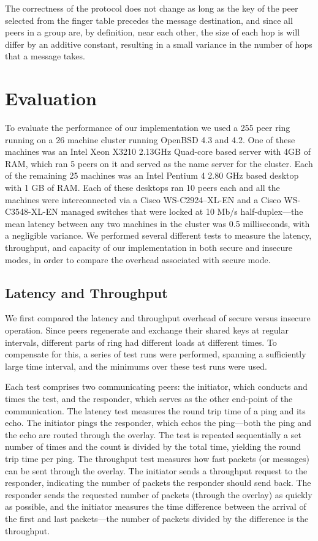 \documentclass[11pt]{article}
\begin{document}
The correctness of the protocol does not change as long as the key 
of the peer selected from the finger table precedes the message
destination, and since all peers in a group are, by definition,
near each other, the size of each hop is will differ by an 
additive constant, resulting in a small variance in the number
of hops that a message takes.


\section{Evaluation}\label{sec:eval}
To evaluate the performance of our implementation we used a 255
peer ring running on a 26 machine cluster running OpenBSD 4.3 and
4.2.  One of these machines was an Intel Xeon X3210 2.13GHz Quad-core
based server with 4GB of RAM, which ran 5 peers on it and served
as the name server for the cluster.  Each of the remaining 25
machines was an Intel Pentium 4 2.80 GHz based desktop with 1 GB
of RAM.  Each of these desktops ran 10 peers each and all the
machines were interconnected via a Cisco WS-C2924--XL-EN and a Cisco
WS-C3548-XL-EN managed switches that were locked at 10 Mb/s
half-duplex---the mean latency between any two machines in the
cluster was 0.5 milliseconds, with a negligible variance.
We performed several different tests to measure the latency,
throughput, and capacity of our implementation in both secure and
insecure modes, in order to compare the overhead associated with 
secure mode.

\subsection{Latency and Throughput}
We first compared the latency and throughput overhead of secure
versus insecure operation.  Since peers regenerate and exchange
their shared keys at regular intervals, different parts of ring had
different loads at different times.  To compensate for this, a
series of test runs were performed, spanning a sufficiently large
time interval, and the minimums over these test runs were used.

Each test comprises two communicating peers: the initiator, which
conducts and times the test, and the responder, which serves as the
other end-point of the communication.  The latency test measures
the round trip time of a ping and its echo.  The initiator pings
the responder, which echos the ping---both the ping and the echo
are routed through the overlay.   The test is repeated sequentially
a set number of times and the count is divided by the total time,
yielding the round trip time per ping.  The throughput test measures
how fast packets (or messages) can be sent through the overlay.
The initiator sends a throughput request to the responder, indicating
the number of packets the responder should send back.  The responder
sends the requested number of packets (through the overlay) as
quickly as possible, and the initiator measures the time difference
between the arrival of the first and last packets---the number of
packets divided by the difference is the throughput.
\end{document}
